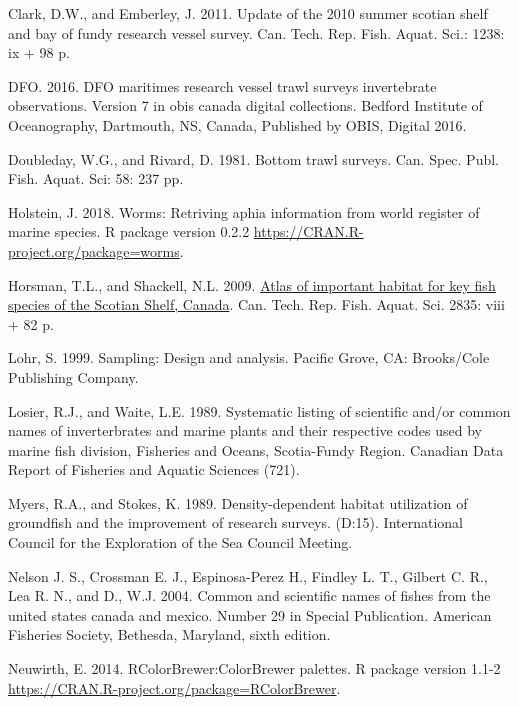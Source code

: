 \documentclass[12pt]{article}\usepackage[]{graphicx}\usepackage[]{color}
\begin{document}
\leavevmode\hypertarget{ref-ClarkEmberley2011}{}%
Clark, D.W., and Emberley, J. 2011. Update of the 2010 summer scotian shelf and bay of fundy research vessel survey. Can. Tech. Rep. Fish. Aquat. Sci.: 1238: ix + 98 p.

\leavevmode\hypertarget{ref-DFO:2016}{}%
DFO. 2016. DFO maritimes research vessel trawl surveys invertebrate observations. Version 7 in obis canada digital collections. Bedford Institute of Oceanography, Dartmouth, NS, Canada, Published by OBIS, Digital 2016.

\leavevmode\hypertarget{ref-DoubledayRivard1981}{}%
Doubleday, W.G., and Rivard, D. 1981. Bottom trawl surveys. Can. Spec. Publ. Fish. Aquat. Sci: 58: 237 pp.

\leavevmode\hypertarget{ref-R:package:worms}{}%
Holstein, J. 2018. Worms: Retriving aphia information from world register of marine species. R package version 0.2.2 \url{https://CRAN.R-project.org/package=worms}.

\leavevmode\hypertarget{ref-Horsman:atlas:2009}{}%
Horsman, T.L., and Shackell, N.L. 2009. \href{http://publications.gc.ca/site/eng/353896/publication.html}{Atlas of important habitat for key fish species of the Scotian Shelf, Canada}. Can. Tech. Rep. Fish. Aquat. Sci. 2835: viii + 82 p.

\leavevmode\hypertarget{ref-Lohr1999}{}%
Lohr, S. 1999. Sampling: Design and analysis. Pacific Grove, CA: Brooks/Cole Publishing Company.

\leavevmode\hypertarget{ref-LosierWaite1989}{}%
Losier, R.J., and Waite, L.E. 1989. Systematic listing of scientific and/or common names of inverterbrates and marine plants and their respective codes used by marine fish division, Fisheries and Oceans, Scotia-Fundy Region. Canadian Data Report of Fisheries and Aquatic Sciences (721).

\leavevmode\hypertarget{ref-Myers:Stokes:1989}{}%
Myers, R.A., and Stokes, K. 1989. Density-dependent habitat utilization of groundfish and the improvement of research surveys. (D:15). International Council for the Exploration of the Sea Council Meeting.

\leavevmode\hypertarget{ref-Nelsonetal:2004}{}%
Nelson J. S., Crossman E. J., Espinosa-Perez H., Findley L. T., Gilbert C. R., Lea R. N., and D., W.J. 2004. Common and scientific names of fishes from the united states canada and mexico. Number 29 in Special Publication. American Fisheries Society, Bethesda, Maryland, sixth edition.

\leavevmode\hypertarget{ref-R:package:RColorBrewer}{}%
Neuwirth, E. 2014. RColorBrewer:ColorBrewer palettes. R package version 1.1-2 \url{https://CRAN.R-project.org/package=RColorBrewer}.
\end{document}
